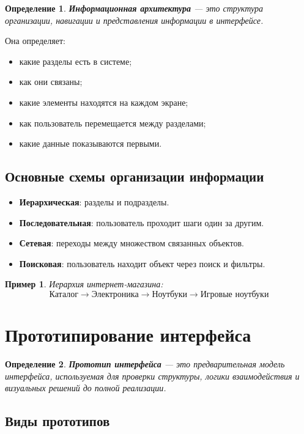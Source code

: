 \documentclass[12pt,a4paper]{article}
\newtheorem{definition}{Определение}
\newtheorem{example}{Пример}
\begin{document}
\begin{definition}
\textbf{Информационная архитектура} --- это структура организации, навигации и представления информации в интерфейсе.
\end{definition}

Она определяет:
\begin{itemize}
    \item какие разделы есть в системе;
    \item как они связаны;
    \item какие элементы находятся на каждом экране;
    \item как пользователь перемещается между разделами;
    \item какие данные показываются первыми.
\end{itemize}

\subsection{Основные схемы организации информации}

\begin{itemize}
    \item \textbf{Иерархическая}: разделы и подразделы.
    \item \textbf{Последовательная}: пользователь проходит шаги один за другим.
    \item \textbf{Сетевая}: переходы между множеством связанных объектов.
    \item \textbf{Поисковая}: пользователь находит объект через поиск и фильтры.
\end{itemize}

\begin{example}
Иерархия интернет-магазина:
\[
\text{Каталог} \rightarrow \text{Электроника} \rightarrow \text{Ноутбуки} \rightarrow \text{Игровые ноутбуки}
\]
\end{example}

\section{Прототипирование интерфейса}

\begin{definition}
\textbf{Прототип интерфейса} --- это предварительная модель интерфейса, используемая для проверки структуры, логики взаимодействия и визуальных решений до полной реализации.
\end{definition}

\subsection{Виды прототипов}
\end{document}
